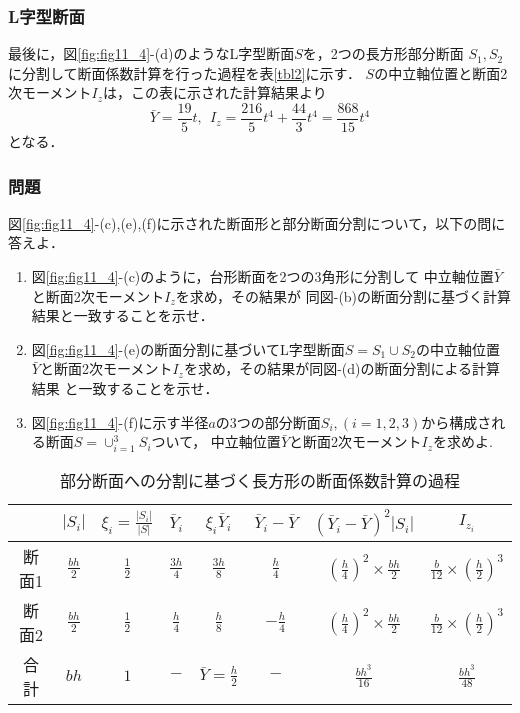 ﻿\documentclass[10pt,a4j]{jbook}
\begin{document}
\subsubsection{L字型断面}
最後に，図\ref{fig:fig11_4}-(d)のようなL字型断面$S$を，2つの長方形部分断面
$S_1,S_2$に分割して断面係数計算を行った過程を表\ref{tbl2}に示す．
$S$の中立軸位置と断面2次モーメント$I_z$は，この表に示された計算結果より
\begin{equation}
	\bar{Y}=\frac{19}{5}t, \ \ 
	I_z=\frac{216}{5}t^4+\frac{44}{3}t^4 = \frac{868}{15}t^4
\end{equation}
となる．
\subsubsection{問題}
図\ref{fig:fig11_4}-(c),(e),(f)に示された断面形と部分断面分割について，以下の問に答えよ．
\begin{enumerate}
\item
図\ref{fig:fig11_4}-(c)のように，台形断面を2つの3角形に分割して
中立軸位置$\bar{Y}$と断面2次モーメント$I_z$を求め，その結果が
同図-(b)の断面分割に基づく計算結果と一致することを示せ．
\item
図\ref{fig:fig11_4}-(e)の断面分割に基づいてL字型断面$S=S_1\cup S_2$の中立軸位置
$\bar{Y}$と断面2次モーメント$I_z$を求め，その結果が同図-(d)の断面分割による計算結果
と一致することを示せ．
\item
図\ref{fig:fig11_4}-(f)に示す半径$a$の3つの部分断面$S_i,(i=1,2,3)$から構成される断面$S=\cup_{i=1}^3S_i$ついて，
中立軸位置$\bar{Y}$と断面2次モーメント$I_z$を求めよ.
\end{enumerate}
\begin{table}
\begin{center}
	\caption{部分断面への分割に基づく長方形の断面係数計算の過程}
	\begin{tabular}{c||c|c|c|c|c|c|c}
		&
		$\left| S_i \right|$ & 
		$ \xi_i=\frac{\left| S_i \right|}{\left| S\right|} $  &
		$ \bar{Y}_i $ & 
		$ \xi_i\bar{Y}_i $ & 
		$\bar{Y}_i -\bar Y$ & 
		$ \left(\bar{Y}_i -\bar Y\right)^2\left| S_i \right|$ & 
		$ I_{z_i}$  
		\\
		\hline 
		断面1&	
		$\frac{bh}{2}$ & 
		$\frac{1}{2}$  &
		$\frac{3h}{4}$ & 
		$\frac{3h}{8}$ & 
		$\frac{h}{4}$ & 
		$\left(\frac{h}{4}\right)^2 \times \frac{bh}{2}$ & 
		$\frac{b}{12}\times \left(\frac{h}{2}\right)^3$  
		\\
		\hline
		断面2&	
		$\frac{bh}{2}$ & 
		$\frac{1}{2}$  &
		$\frac{h}{4}$ & 
		$\frac{h}{8}$ & 
		$-\frac{h}{4}$ & 
		$\left(\frac{h}{4}\right)^2 \times \frac{bh}{2}$ & 
		$\frac{b}{12}\times \left(\frac{h}{2}\right)^3$  
		\\
		\hline 
		合計&	
		$bh$ & 
		$1$  &
		$-$ & 
		$\bar Y =\frac{h}{2}$ & 
		$-$ & 
		$\frac{bh^3}{16}$ & 
		$\frac{bh^3}{48}$ 
	\end{tabular}
\label{tbl0}
\end{center}
\end{table}
\end{document}
